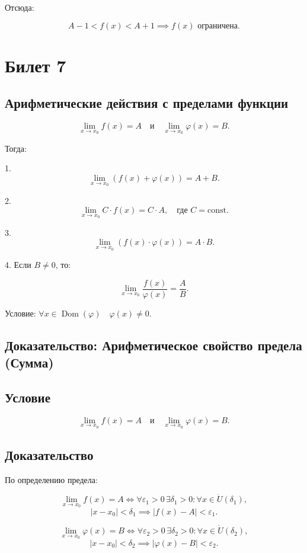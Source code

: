 \documentclass{article}
\begin{document}
Отсюда:

\[
A - 1 < f(x) < A + 1 \implies f(x) \text{ ограничена}.
\]

\section{Билет 7}

\subsection{Арифметические действия с пределами функции} 

\[
\lim_{x \to x_0} f(x) = A \quad \text{и} \quad \lim_{x \to x_0} \varphi(x) = B.
\]

Тогда:

1. \[
\lim_{x \to x_0} (f(x) + \varphi(x)) = A + B.
\]

2. \[
\lim_{x \to x_0} C \cdot f(x) = C \cdot A, \quad \text{где } C = \text{const}.
\]

3. \[
\lim_{x \to x_0} (f(x) \cdot \varphi(x)) = A \cdot B.
\]

4. Если $B \neq 0$, то:

\[
\lim_{x \to x_0} \frac{f(x)}{\varphi(x)} = \frac{A}{B}.
\]

Условие: $\forall x \in \operatorname{Dom}(\varphi) \quad \varphi(x) \neq 0$.

\subsection*{Доказательство: Арифметическое свойство предела (Сумма)}

\subsection*{Условие}
\[
\lim_{x \to x_0} f(x) = A \quad \text{и} \quad \lim_{x \to x_0} \varphi(x) = B.
\]

\subsection*{Доказательство}
По определению предела:

\[
\lim_{x \to x_0} f(x) = A \iff \forall \varepsilon_1 > 0 \, \exists \delta_1 > 0 : \forall x \in \dot{U}(\delta_1),
\]
\[
|x - x_0| < \delta_1 \implies |f(x) - A| < \varepsilon_1.
\]

\[
\lim_{x \to x_0} \varphi(x) = B \iff \forall \varepsilon_2 > 0 \, \exists \delta_2 > 0 : \forall x \in \dot{U}(\delta_2),
\]
\[
|x - x_0| < \delta_2 \implies |\varphi(x) - B| < \varepsilon_2.
\]
\end{document}
